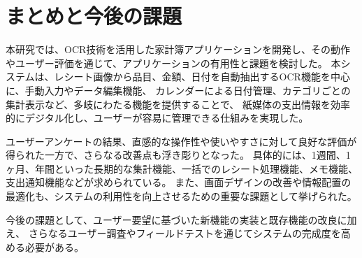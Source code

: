 \documentclass[main]{subfiles}
\begin{document}
\chapter{まとめと今後の課題}
\label{cha:conclusion}

本研究では、OCR技術を活用した家計簿アプリケーションを開発し、その動作やユーザー評価を通じて、アプリケーションの有用性と課題を検討した。
本システムは、レシート画像から品目、金額、日付を自動抽出するOCR機能を中心に、手動入力やデータ編集機能、
カレンダーによる日付管理、カテゴリごとの集計表示など、多岐にわたる機能を提供することで、
紙媒体の支出情報を効率的にデジタル化し、ユーザーが容易に管理できる仕組みを実現した。

ユーザーアンケートの結果、直感的な操作性や使いやすさに対して良好な評価が得られた一方で、さらなる改善点も浮き彫りとなった。
具体的には、1週間、1ヶ月、年間といった長期的な集計機能、一括でのレシート処理機能、メモ機能、支出通知機能などが求められている。
また、画面デザインの改善や情報配置の最適化も、システムの利用性を向上させるための重要な課題として挙げられた。

今後の課題として、ユーザー要望に基づいた新機能の実装と既存機能の改良に加え、
さらなるユーザー調査やフィールドテストを通じてシステムの完成度を高める必要がある。
\end{document}
